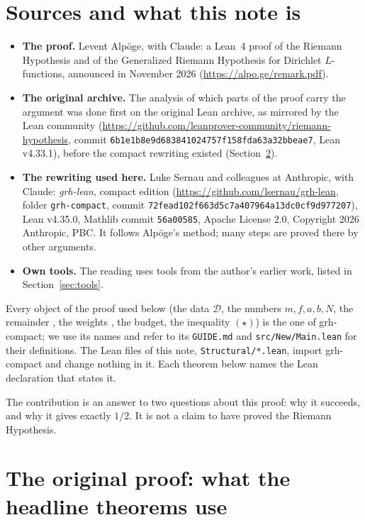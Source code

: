 \documentclass[11pt]{article}
\theoremstyle{definition}
\theoremstyle{remark}
\begin{document}
\section{Sources and what this note is}

\begin{itemize}
\item \textbf{The proof.} Levent Alpöge, with Claude: a Lean~4 proof of the Riemann Hypothesis and
of the Generalized Riemann Hypothesis for Dirichlet $L$-functions, announced in November 2026
(\url{https://alpo.ge/remark.pdf}).
\item \textbf{The original archive.} The analysis of which parts of the proof carry the argument
was done first on the original Lean archive, as mirrored by the Lean community
(\url{https://github.com/leanprover-community/riemann-hypothesis}, commit
\texttt{6b1e1b8e9d683841024757f158fda63a32bbeae7}, Lean v4.33.1), before the compact rewriting
existed (Section~\ref{sec:original}).
\item \textbf{The rewriting used here.} Luke Sernau and colleagues at Anthropic, with Claude:
\emph{grh-lean}, compact edition (\url{https://github.com/lsernau/grh-lean}, folder
\texttt{grh-compact}, commit \texttt{72fead102f663d5c7a407964a13dc0cf9d977207}), Lean v4.35.0,
Mathlib commit \texttt{56a00585}, Apache License 2.0, Copyright 2026 Anthropic, PBC. It follows
Alpöge's method; many steps are proved there by other arguments.
\item \textbf{Own tools.} The reading uses tools from the author's earlier work, listed in
Section~\ref{sec:tools}.
\end{itemize}

Every object of the proof used below (the data $\mathcal D$, the numbers $m,f,a,b,N$, the remainder
, the weights , the budget, the inequality $(\star)$) is the one of
grh-compact; we use its names and refer to its \texttt{GUIDE.md} and \texttt{src/New/Main.lean} for
their definitions. The Lean files of this note, \texttt{Structural/*.lean}, import grh-compact and
change nothing in it. Each theorem below names the Lean declaration that states it.

The contribution is an answer to two questions about this proof: why it succeeds, and why it gives
exactly $1/2$. It is not a claim to have proved the Riemann Hypothesis.

\section{The original proof: what the headline theorems use}\label{sec:original}
\end{document}

